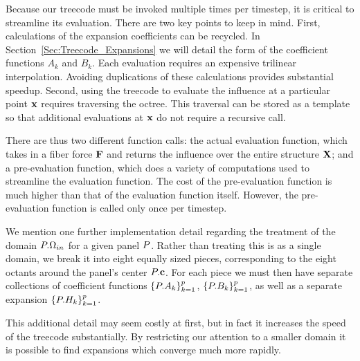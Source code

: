 Because our treecode must be invoked multiple times per timestep, it is critical to streamline its evaluation. There are two key points to keep in mind. First, calculations of the expansion coefficients can be recycled. In Section~\ref{Sec:Treecode_Expansions} we will detail the form of the coefficient functions $A_k$ and $B_k$. Each evaluation requires an expensive trilinear interpolation. Avoiding duplications of these calculations provides substantial speedup. Second, using the treecode to evaluate the influence at a particular point $\mathbf{x}$ requires traversing the octree. This traversal can be stored as a template so that additional evaluations at $\mathbf{x}$ do not require a recursive call.

There are thus two different function calls: the actual evaluation function, which takes in a fiber force $\mathbf{F}$ and returns the influence over the entire structure $\mathbf{X}$; and a pre-evaluation function, which does a variety of computations used to streamline the evaluation function. The cost of the pre-evaluation function is much higher than that of the evaluation function itself. However, the pre-evaluation function is called only once per timestep.

We mention one further implementation detail regarding the treatment of the domain $P.\Omega_{in}$ for a given panel $P$. Rather than treating this is as a single domain,  we break it into eight equally sized pieces, corresponding to the eight octants around the panel's center $P.\mathbf{c}$. For each piece we must then have separate collections of coefficient functions $\{P.A_k\}_{k=1}^{p}$, $\{P.B_k\}_{k=1}^{p}$, as well as a separate expansion $\{P.H_k\}_{k=1}^{p}$.

This additional detail may seem costly at first, but in fact it increases the speed of the treecode substantially. By restricting our attention to a smaller domain it is possible to find expansions which converge much more rapidly.

